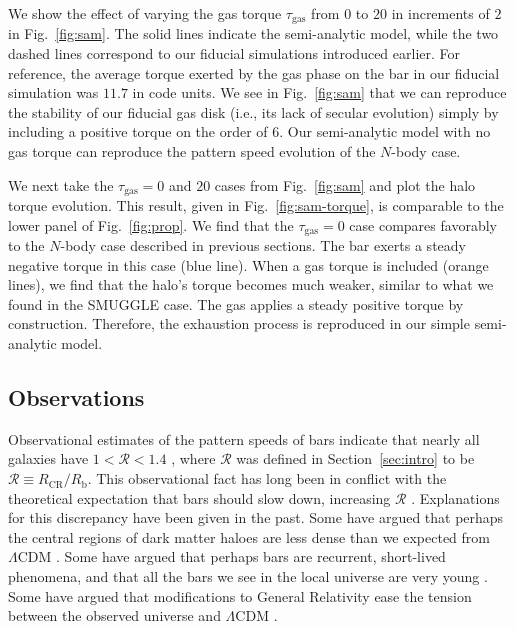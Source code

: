 \documentclass[twocolumn,linenumbers,trackchanges]{aastex631}
\newcommand{\RCR}{\ensuremath{R_{\textrm{CR}}}}
\newcommand{\Rot}{\ensuremath{\mathcal{R}}}
\newcommand{\Rb}{\ensuremath{R_{\textrm{b}}}}
\newcommand{\Nbody}{$N$-body}
\newcommand{\SMUGGLE}{SMUGGLE}
\begin{document}
We show the effect of varying the gas torque $\tau_{\textrm{gas}}$ from $0$ to
$20$ in increments of $2$ in Fig.~\ref{fig:sam}. The solid lines indicate the
semi-analytic model, while the two dashed lines correspond to our fiducial
simulations introduced earlier. For reference, the average torque exerted by the
gas phase on the bar in our fiducial simulation was $11.7$ in code units. We see
in Fig.~\ref{fig:sam} that we can reproduce the stability of our fiducial gas
disk (i.e., its lack of secular evolution) simply by including a positive torque
on the order of $6$. Our semi-analytic model with no gas torque can reproduce
the pattern speed evolution of the $N$-body case.

We next take the $\tau_{\textrm{gas}}=0$ and $20$ cases from Fig.~\ref{fig:sam}
and plot the halo torque evolution. This result, given in Fig.~\ref{fig:sam-torque},
is comparable to the lower panel of Fig.~\ref{fig:prop}. We find that the
$\tau_{\textrm{gas}}=0$ case compares favorably to the \Nbody{} case described
in previous sections. The bar exerts a steady negative torque in this case (blue
line). When a gas torque is included (orange lines), we find that the halo's
torque becomes much weaker, similar to what we found in the \SMUGGLE{} case. The
gas applies a steady positive torque by construction. Therefore, the exhaustion
process is reproduced in our simple semi-analytic model.

\subsection{Observations}
Observational estimates of the pattern speeds of bars indicate that nearly all
galaxies have $1 < \Rot < 1.4$ \citep{2011MSAIS..18...23C, 2015AA...576A.102A,
2019MNRAS.482.1733G, 2020MNRAS.491.3655G}, where $\Rot$ was defined in
Section~\ref{sec:intro} to be $\Rot\equiv \RCR/\Rb$. This observational fact has
long been in conflict with the theoretical expectation that bars should slow
down, increasing \Rot{} \citep[e.g.][]{1984MNRAS.209..729T, 1985MNRAS.213..451W,
2000ApJ...543..704D}. Explanations for this discrepancy have been given in the
past. Some have argued that perhaps the central regions of dark matter haloes
are less dense than we expected from $\Lambda\textrm{CDM}$
\citep[e.g.][]{2000ApJ...543..704D,2021AA...650L..16F}. Some have argued that
perhaps bars are recurrent, short-lived phenomena, and that all the bars we see
in the local universe are very young \citep{2002AA...392...83B,
2005MNRAS.364L..18B}. Some have argued that modifications to General Relativity
ease the tension between the observed universe and $\Lambda\textrm{CDM}$
\citep[e.g.][]{2021MNRAS.503.2833R, 2021MNRAS.508..926R}.
\end{document}
